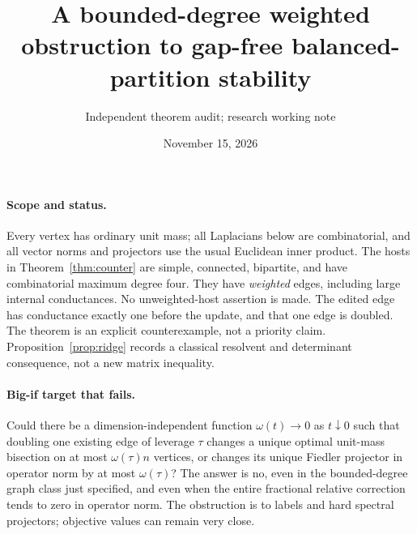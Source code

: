 \documentclass[11pt]{article}
\title{A bounded-degree weighted obstruction to gap-free balanced-partition stability}
\author{Independent theorem audit; research working note}
\date{November 15, 2026}
\begin{document}
\maketitle

\paragraph{Scope and status.}
Every vertex has ordinary unit mass; all Laplacians below are
combinatorial, and all vector norms and projectors use the usual
Euclidean inner product. The hosts in Theorem~\ref{thm:counter} are
simple, connected, bipartite, and have combinatorial maximum degree
four. They have \emph{weighted} edges, including large internal
conductances. No unweighted-host assertion is made. The edited edge
has conductance exactly one before the update, and that one edge is
doubled. The theorem is an explicit counterexample, not a priority
claim. Proposition~\ref{prop:ridge} records a classical resolvent and
determinant consequence, not a new matrix inequality.

\paragraph{Big-if target that fails.}
Could there be a dimension-independent function $\omega(t)\to0$ as
$t\downarrow0$ such that doubling one existing edge of leverage $\tau$
changes a unique optimal unit-mass bisection on at most
$\omega(\tau)n$ vertices, or changes its unique Fiedler projector in
operator norm by at most $\omega(\tau)$? The answer is no, even in the
bounded-degree graph class just specified, and even when the entire
fractional relative correction tends to zero in operator norm.
The obstruction is to labels and hard spectral projectors; objective
values can remain very close.
\end{document}
